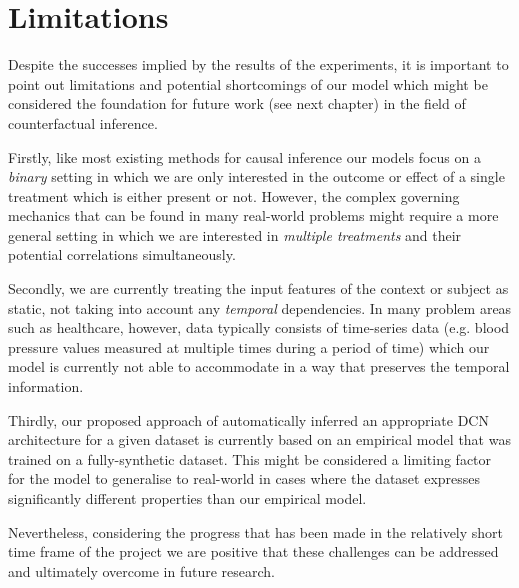 \section{Limitations}
Despite the successes implied by the results of the experiments, it is important to point out limitations and potential shortcomings of our model which might be considered the foundation for future work (see next chapter) in the field of counterfactual inference. 

Firstly, like most existing methods for causal inference our models focus on a \emph{binary} setting in which we are only interested in the outcome or effect of a single treatment which is either present or not. However, the complex governing mechanics that can be found in many real-world problems might require a more general setting in which we are interested in \emph{multiple treatments} and their potential correlations simultaneously.

Secondly, we are currently treating the input features of the context or subject as static, not taking into account any \emph{temporal} dependencies. In many problem areas such as healthcare, however, data typically consists of time-series data (e.g. blood pressure values measured at multiple times during a period of time) which our model is currently not able to accommodate in a way that preserves the temporal information. 

Thirdly, our proposed approach of automatically inferred an appropriate DCN architecture for a given dataset is currently based on an empirical model that was trained on a fully-synthetic dataset. This might be considered a limiting factor for the model to generalise to real-world in cases where the dataset expresses significantly different properties than our empirical model.  

Nevertheless, considering the progress that has been made in the relatively short time frame of the project we are positive that these challenges can be addressed and ultimately overcome in future research.


%


